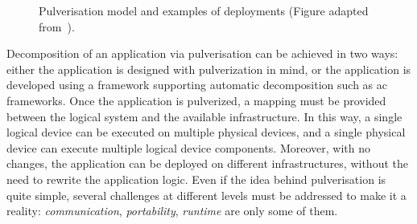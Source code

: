 \documentclass[12pt]{article}
\begin{document}
\begin{figure}
\begin{minipage}{\columnwidth}
\begin{minipage}{0.48\columnwidth}
		\end{minipage}
	\end{minipage}

	\caption{Pulverisation model and examples of deployments (Figure adapted from~\cite{DBLP:journals/fi/CasadeiPPVW20}).}
	\label{fig:pulv}
\end{figure}
%
Decomposition of an application via pulverisation can be achieved in two ways:
either the application is designed with pulverization in mind,
or the application is developed using a framework supporting automatic decomposition such as \ac{ac} frameworks.
%
Once the application is pulverized,
a mapping must be provided between the logical system and the available infrastructure.
%
In this way,
a single logical device can be executed on multiple physical devices,
and a single physical device can execute multiple logical device components.
%
Moreover,
with no changes,
the application can be deployed on different infrastructures,
without the need to rewrite the application logic.
%
Even if the idea behind pulverisation is quite simple,
several challenges at different levels must be addressed to make it a reality:
\emph{communication}, \emph{portability}, \emph{runtime} are only some of them.
\end{document}
